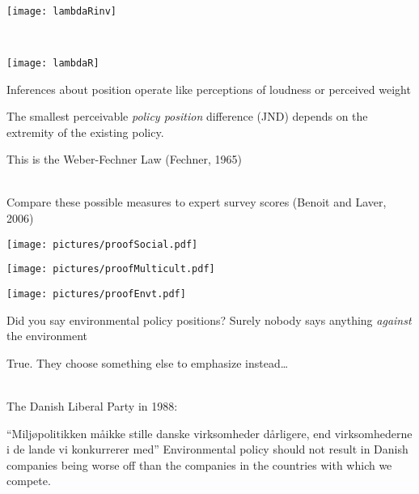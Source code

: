 \documentclass[kp]{foilpack}
\begin{document}

~\\
\centerline{\texttt{[image: lambdaRinv]}}


~\\
\centerline{\texttt{[image: lambdaR]}}



Inferences about position operate like perceptions of loudness or perceived weight 

The smallest perceivable \textsl{policy position} difference (JND) depends on the extremity of the existing policy.

\ita
\itm This is the Weber-Fechner Law (Fechner, 1965)
\itz


~\\
Compare these possible measures to expert survey scores (Benoit and Laver, 2006)

\newpage

\begin{center}
    \texttt{[image: pictures/proofSocial.pdf]}
\end{center}
\newpage

\begin{center}
   \texttt{[image: pictures/proofMulticult.pdf]}
\end{center}
\newpage

\begin{center}
    \texttt{[image: pictures/proofEnvt.pdf]}
\end{center}


Did you say environmental policy positions?  Surely nobody says anything \textit{against} the environment


True.  They choose something else to emphasize instead\ldots

~\\
The Danish Liberal Party in 1988:

\ita
\itm ``Milj\o politikken m\aa ikke stille danske virksomheder d\aa rligere, end
  virksomhederne i de lande vi konkurrerer med''
\itm Environmental policy should not result in Danish companies
  being worse off than the companies in the countries with which we
  compete.
\itz
\end{document}

